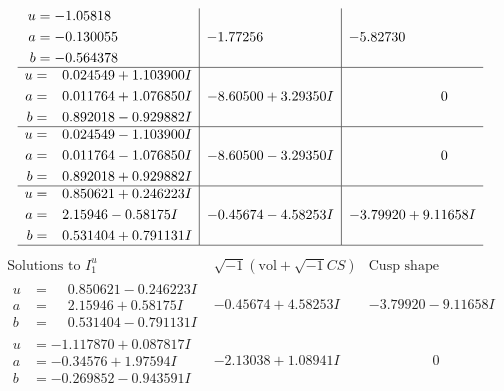 \documentclass[1p]{elsarticle_modified}
\theoremstyle{definition}
\newcommand{\I}{\sqrt{-1}}
\begin{document}
$$\begin{array}{c|c|c}
\begin{aligned}
u &= -1.05818\phantom{ +0.000000I} \\
a &= -0.130055\phantom{ +0.000000I} \\
b &= -0.564378\phantom{ +0.000000I}\end{aligned}
 & -1.77256\phantom{ +0.000000I} & -5.82730\phantom{ +0.000000I} \\ \hline\begin{aligned}
u &= \phantom{-}0.024549 + 1.103900 I \\
a &= \phantom{-}0.011764 + 1.076850 I \\
b &= \phantom{-}0.892018 - 0.929882 I\end{aligned}
 & -8.60500 + 3.29350 I & \phantom{-0.000000 } 0 \\ \hline\begin{aligned}
u &= \phantom{-}0.024549 - 1.103900 I \\
a &= \phantom{-}0.011764 - 1.076850 I \\
b &= \phantom{-}0.892018 + 0.929882 I\end{aligned}
 & -8.60500 - 3.29350 I & \phantom{-0.000000 } 0 \\ \hline\begin{aligned}
u &= \phantom{-}0.850621 + 0.246223 I \\
a &= \phantom{-}2.15946 - 0.58175 I \\
b &= \phantom{-}0.531404 + 0.791131 I\end{aligned}
 & -0.45674 - 4.58253 I & -3.79920 + 9.11658 I\\
 \hline 
 \end{array}$$\newpage$$\begin{array}{c|c|c}  
\text{Solutions to }I^u_{1}& \I (\text{vol} + \sqrt{-1}CS) & \text{Cusp shape}\\
 \hline 
\begin{aligned}
u &= \phantom{-}0.850621 - 0.246223 I \\
a &= \phantom{-}2.15946 + 0.58175 I \\
b &= \phantom{-}0.531404 - 0.791131 I\end{aligned}
 & -0.45674 + 4.58253 I & -3.79920 - 9.11658 I \\ \hline\begin{aligned}
u &= -1.117870 + 0.087817 I \\
a &= -0.34576 + 1.97594 I \\
b &= -0.269852 - 0.943591 I\end{aligned}
 & -2.13038 + 1.08941 I & \phantom{-0.000000 } 0 \\ \hline\begin{aligned}

\end{aligned}
\end{array}$$
\end{document}
